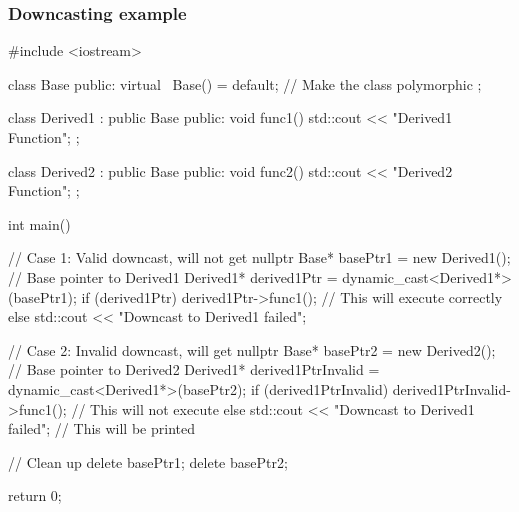 \documentclass{report}
\begin{document}
    \pagebreak 
    \subsubsection{Downcasting example}
    \bigbreak \noindent 
    \begin{cppcode}
        #include <iostream>

        class Base {
            public:
            virtual ~Base() = default; // Make the class polymorphic
        };

        class Derived1 : public Base {
            public:
            void func1() {
                std::cout << "Derived1 Function\n";
            }
        };

        class Derived2 : public Base {
            public:
            void func2() {
                std::cout << "Derived2 Function\n";
            }
        };

        int main() {
            // Case 1: Valid downcast, will not get nullptr
            Base* basePtr1 = new Derived1(); // Base pointer to Derived1
            Derived1* derived1Ptr = dynamic_cast<Derived1*>(basePtr1);
            if (derived1Ptr) {
                derived1Ptr->func1(); // This will execute correctly
            } else {
                std::cout << "Downcast to Derived1 failed\n";
            }

            // Case 2: Invalid downcast, will get nullptr
            Base* basePtr2 = new Derived2(); // Base pointer to Derived2
            Derived1* derived1PtrInvalid = dynamic_cast<Derived1*>(basePtr2);
            if (derived1PtrInvalid) {
                derived1PtrInvalid->func1(); // This will not execute
            } else {
                std::cout << "Downcast to Derived1 failed\n"; // This will be printed
            }

            // Clean up
            delete basePtr1;
            delete basePtr2;

            return 0;
        }
    \end{cppcode}

    \pagebreak 

    \bigbreak \noindent 
\end{document}
